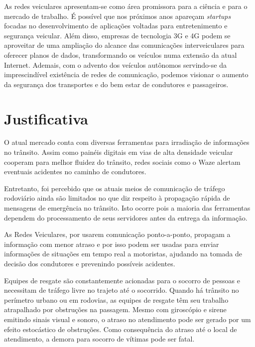 \documentclass[
12pt,				%
openright,			%
oneside,			%
a4paper,			%
brazil,				%
]{abntex2}
\begin{document}
	\par As redes veiculares apresentam-se como área promissora para a ciência e para o mercado de trabalho. É possível que nos próximos anos apareçam \textit{startups} focadas no desenvolvimento de aplicações voltadas para entretenimento e segurança veicular. Além disso, empresas de tecnologia 3G e 4G podem se aproveitar de uma ampliação do alcance das comunicações interveiculares para oferecer planos de dados, transformando os veículos numa extensão da atual Internet. Ademais, com o advento dos veículos autônomos servindo-se da imprescindível existência de redes de comunicação, podemos visionar o aumento da segurança dos transportes e do bem estar de condutores  e passageiros.
	
	
	\section{Justificativa}
	
	\par O atual mercado conta com diversas ferramentas para irradiação de informações no trânsito. Assim como painéis digitais em vias de alta densidade veicular cooperam para melhor fluidez do trânsito, redes sociais como o Waze alertam eventuais acidentes no caminho de condutores. 
	
	\par Entretanto, foi percebido que os atuais meios de comunicação de tráfego rodoviário ainda são limitados no que diz respeito à propagação rápida de mensagens de emergência no trânsito. Isto ocorre pois a maioria das ferramentas dependem do processamento de seus servidores antes da entrega da informação.
	
	\par As Redes Veiculares, por usarem comunicação ponto-a-ponto, propagam a informação com menor atraso e por isso podem ser usadas para enviar informações de situações em tempo real a motoristas, ajudando na tomada de decisão dos condutores e prevenindo possíveis acidentes.
	
	\par Equipes de resgate são constantemente acionadas para o socorro de pessoas e necessitam de tráfego livre no trajeto até o socorrido. Quando há trânsito no perímetro urbano ou em rodovias, as equipes de resgate têm seu trabalho atrapalhado por obstruções na passagem. Mesmo com giroscópio e sirene emitindo sinais visual e sonoro, o atraso no atendimento pode ser gerado por um efeito estocástico de obstruções. Como consequência do atraso até o local de atendimento, a demora para socorro de vítimas pode ser fatal.
	
\end{document}
